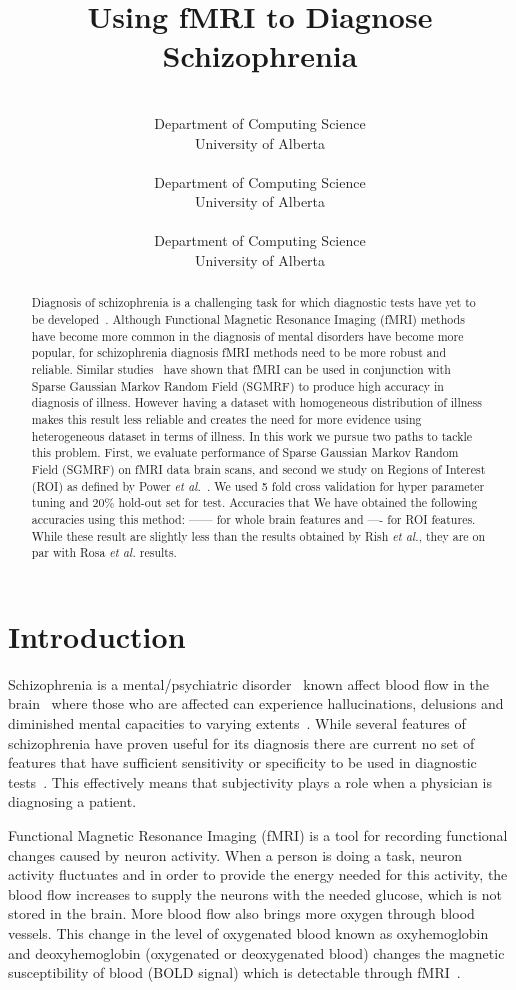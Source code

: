 \documentclass{article} %
\title{Using fMRI to Diagnose Schizophrenia}
\author{%
	\\
	Department of Computing Science\\
	University of Alberta\\
	\texttt{} 
\And 
 \\
Department of Computing Science\\
University of Alberta\\
\texttt{}
\And 
\\
Department of Computing Science\\
University of Alberta\\
\texttt{}  
}
\begin{document}
	\maketitle

\begin{abstract}
Diagnosis of schizophrenia is a challenging task for which diagnostic tests
have yet to be developed~\cite{McGuire200891}. Although Functional Magnetic 
Resonance Imaging (fMRI) methods have become more common in the diagnosis of 
mental disorders have become more popular, for schizophrenia diagnosis fMRI 
methods need to be more robust and reliable. Similar 
studies~\cite{Rish_2013}\cite{Rosa_2013} have shown that fMRI can be used in 
conjunction with Sparse Gaussian Markov Random Field (SGMRF) to produce high 
accuracy in diagnosis of illness.
However having a dataset with homogeneous distribution of illness makes this 
result less reliable and creates the need for more evidence using 
heterogeneous dataset in terms of illness. 
In this work we pursue two paths to tackle this problem. First, we evaluate 
performance of Sparse Gaussian Markov Random Field (SGMRF) on fMRI data 
brain scans, and second we study on Regions of Interest (ROI) as defined by
Power \emph{et al.}~\cite{Power_2011}. 
We used 5 fold cross validation for hyper parameter tuning and $20\%$ hold-out 
set for test. Accuracies that We have obtained the following accuracies using 
this method: —— for whole brain features and —- for ROI features. While these 
result are slightly less than the results obtained by Rish \emph{et al.}, 
they are on par with Rosa \emph{et al.} results.  
\end{abstract}


\section{Introduction}
Schizophrenia is a mental/psychiatric disorder~\cite{Rish_2013, Kenji_2010} 
known affect blood flow in the brain~\cite{Kenji_2010} where those who are 
affected can experience hallucinations, delusions and diminished mental 
capacities to varying extents~\cite{jablensky2010diagnostic}. While several
features of schizophrenia have proven useful for its diagnosis there are
current no set of features that have sufficient sensitivity or specificity
to be used in diagnostic tests~\cite{jablensky2010diagnostic}. This 
effectively means that subjectivity plays a role when a physician is 
diagnosing a patient. 

Functional Magnetic Resonance Imaging (fMRI) is a tool for recording 
functional changes caused by neuron activity\cite{}. When a person is doing a 
task, neuron activity fluctuates and in order to provide the energy 
needed for this activity, the blood flow increases to supply the neurons with 
the needed glucose, which is not stored in the brain\cite{}. More blood flow also 
brings more oxygen through blood vessels. This change in the level of 
oxygenated blood known as oxyhemoglobin and deoxyhemoglobin (oxygenated or 
deoxygenated blood) changes the magnetic susceptibility of blood (BOLD signal) 
which is detectable through fMRI~\cite{}.
\end{document}
